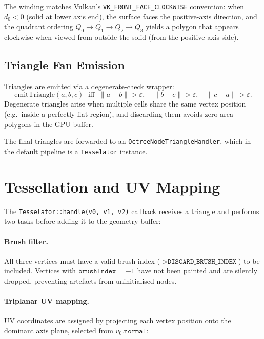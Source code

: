 \documentclass[10pt,a4paper]{article}
\begin{document}
The winding matches Vulkan's \texttt{VK\_FRONT\_FACE\_CLOCKWISE}
convention: when $d_0 < 0$ (solid at lower axis end), the surface faces
the positive-axis direction, and the quadrant ordering
$Q_0\!\to\!Q_1\!\to\!Q_2\!\to\!Q_3$ yields a polygon that appears
clockwise when viewed from outside the solid (from the positive-axis side).

\subsection{Triangle Fan Emission}

Triangles are emitted via a degenerate-check wrapper:
\[
  \text{emitTriangle}(a, b, c) \;\text{ iff }\;
    \|a-b\| > \varepsilon, \quad \|b-c\| > \varepsilon, \quad \|c-a\| > \varepsilon.
\]
Degenerate triangles arise when multiple cells share the same vertex
position (e.g.\ inside a perfectly flat region), and discarding them
avoids zero-area polygons in the GPU buffer.

The final triangles are forwarded to an \lstinline{OctreeNodeTriangleHandler},
which in the default pipeline is a \lstinline{Tesselator} instance.

\section{Tessellation and UV Mapping}
\label{sec:tesselator}

The \lstinline{Tesselator::handle(v0, v1, v2)} callback receives a
triangle and performs two tasks before adding it to the geometry buffer:

\paragraph{Brush filter.}
All three vertices must have a valid brush index
($> \texttt{DISCARD\_BRUSH\_INDEX}$) to be included.  Vertices with
$\texttt{brushIndex} = -1$ have not been painted and are silently dropped,
preventing artefacts from uninitialised nodes.

\paragraph{Triplanar UV mapping.}
UV coordinates are assigned by projecting each vertex position onto the
dominant axis plane, selected from $v_0.\texttt{normal}$:
\end{document}
